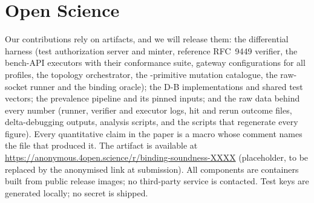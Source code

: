 \section{Open Science}\label{app:openscience}

Our contributions rely on artifacts, and we will release them: the
differential harness (test authorization server and minter, reference RFC~9449
verifier, the \NumFrameworks{} bench-API executors with their conformance suite,
gateway configurations for all \NumGatewayProfiles{} profiles, the topology
orchestrator, the \NumPrimitives{}-primitive mutation catalogue, the raw-socket
runner and the binding oracle); the D-B implementations and shared test
vectors; the prevalence pipeline and its pinned inputs; and the raw data behind
every number (runner, verifier and executor logs, hit and rerun outcome files,
delta-debugging outputs, analysis scripts, and the scripts that regenerate
every figure). Every quantitative claim in the paper is a macro whose comment
names the file that produced it. The artifact is available at
\url{https://anonymous.4open.science/r/binding-soundness-XXXX}
(placeholder, to be replaced by the anonymised link at submission). All
components are containers built from public release images; no third-party
service is contacted. Test keys are generated locally; no secret is shipped.
